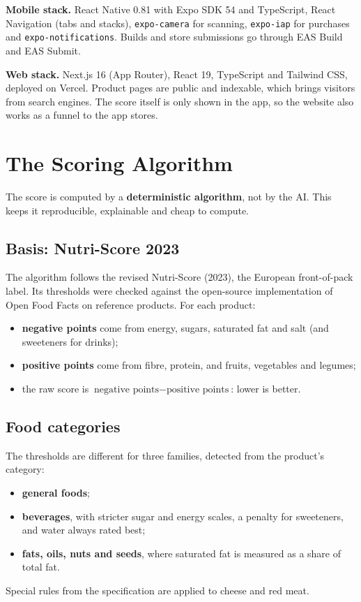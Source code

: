 \documentclass[a4paper,11pt]{article}
\newcommand{\code}[1]{\texttt{#1}}
\begin{document}
\textbf{Mobile stack.} React Native 0.81 with Expo SDK 54 and TypeScript, React Navigation (tabs and stacks), \code{expo-camera} for scanning, \code{expo-iap} for purchases and \code{expo-notifications}. Builds and store submissions go through EAS Build and EAS Submit.

\textbf{Web stack.} Next.js 16 (App Router), React 19, TypeScript and Tailwind CSS, deployed on Vercel. Product pages are public and indexable, which brings visitors from search engines. The score itself is only shown in the app, so the website also works as a funnel to the app stores.

\section{The Scoring Algorithm}

The score is computed by a \textbf{deterministic algorithm}, not by the AI. This keeps it reproducible, explainable and cheap to compute.

\subsection*{Basis: Nutri-Score 2023}
The algorithm follows the revised Nutri-Score (2023), the European front-of-pack label. Its thresholds were checked against the open-source implementation of Open Food Facts on reference products. For each product:
\begin{itemize}
  \item \textbf{negative points} come from energy, sugars, saturated fat and salt (and sweeteners for drinks);
  \item \textbf{positive points} come from fibre, protein, and fruits, vegetables and legumes;
  \item the raw score is $\text{negative points} - \text{positive points}$: lower is better.
\end{itemize}

\subsection*{Food categories}
The thresholds are different for three families, detected from the product's category:
\begin{itemize}
  \item \textbf{general foods};
  \item \textbf{beverages}, with stricter sugar and energy scales, a penalty for sweeteners, and water always rated best;
  \item \textbf{fats, oils, nuts and seeds}, where saturated fat is measured as a share of total fat.
\end{itemize}
Special rules from the specification are applied to cheese and red meat.
\end{document}
